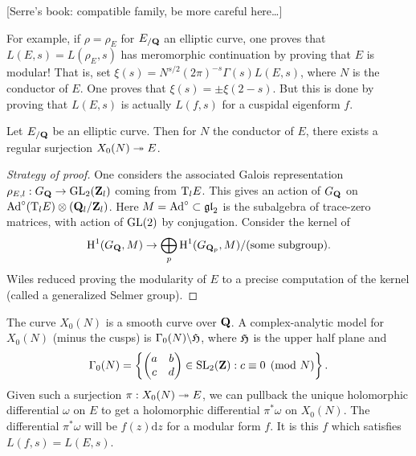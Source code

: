 [Serre's book: compatible family, be more careful here\ldots]

For example, if $\rho=\rho_E$ for $E_{/\mathbf{Q}}$ an elliptic curve, one proves that 
$L(E,s)=L(\rho_E,s)$ has meromorphic continuation by proving that $E$ is 
modular! That is, set $\xi(s)=N^{s/2} (2\pi)^{-s} \Gamma(s) L(E,s)$, where $N$ 
is the conductor of $E$. One proves that $\xi(s)=\pm \xi(2-s)$. But this is 
done by proving that $L(E,s)$ is actually $L(f,s)$ for a cuspidal eigenform 
$f$. 

\begin{theorem}
Let $E_{/\mathbf{Q}}$ be an elliptic curve. Then for $N$ the conductor of $E$, there 
exists a regular surjection $X_0(N)\twoheadrightarrow E$. 
\end{theorem}
\begin{proof}[Strategy of proof]
One considers the associated Galois representation 
$\rho_{E,l}:G_{\mathbf{Q}}\to \operatorname{GL}_2(\mathbf{Z}_l)$ coming from $\mathrm{T}_l E$. This gives an 
action of $G_{\mathbf{Q}}$ on $\operatorname{Ad}^\circ(\mathrm{T}_l E)\otimes (\mathbf{Q}_l/\mathbf{Z}_l)$. Here 
$M=\operatorname{Ad}^\circ\subset \mathfrak{gl}_2$ is the subalgebra of trace-zero 
matrices, with action of $\operatorname{GL}(2)$ by conjugation. Consider the kernel of 
\[
  \operatorname{H}^1(G_{\mathbf{Q}},M) \to \bigoplus_p \operatorname{H}^1(G_{\mathbf{Q}_p},M) / \text{(some subgroup)} .
\]
Wiles reduced proving the modularity of $E$ to a precise computation of 
the kernel (called a generalized Selmer group). 
\end{proof}

The curve $X_0(N)$ is a smooth curve over $\mathbf{Q}$. A complex-analytic model for 
$X_0(N)$ (minus the cusps) is $\Gamma_0(N)\backslash \mathfrak{H}$, where $\mathfrak{H}$ is 
the upper half plane and 
\[
  \Gamma_0(N)=\left\{\begin{pmatrix} a & b \\ c & d\end{pmatrix}\in \operatorname{SL}_2(\mathbf{Z}):c\equiv 0\pmod N\right\} .
\]
Given such a surjection $\pi:X_0(N)\twoheadrightarrow E$, we can pullback the unique 
holomorphic differential $\omega$ on $E$ to get a holomorphic differential 
$\pi^\ast\omega$ on $X_0(N)$. The differential $\pi^\ast\omega$ will be 
$f(z)\mathrm{d} z$ for a modular form $f$. It is this $f$ which satisfies 
$L(f,s) = L(E,s)$. 

